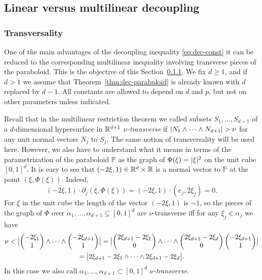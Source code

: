 \subsection{Linear versus multilinear decoupling}
\subsubsection{Transversality}\label{sec:gen:transverse}
One of the main advantages of the decoupling inequality \eqref{eq:dec-const} it can be reduced to the corresponding multilinear inequality involving transverse pieces of the paraboloid.
This is the objective of this Section~\ref{sec:gen:transverse}.
We fix $d\geq 1$, and if $d>1$ we assume that Theorem~\ref{thm:dec-paraboloid} is already known with $d$ replaced by $d-1$.
All constants are allowed to depend on $d$ and $p$, but not on other parameters unless indicated.

Recall that in the multilinear restriction theorem we called subsets $S_{1},\dotsc,S_{d+1}$ of a $d$-dimensional hypersurface in $\R^{d+1}$ \emph{$\nu$-transverse} if $\abs{N_{1} \wedge \dotsb \wedge N_{d+1}} > \nu$ for any unit normal vectors $N_{j}$ to $S_{j}$.
The same notion of transversality will be used here.
However, we also have to understand what it means in terms of the parametrization of the paraboloid $\mathbb{P}$ as the graph of $\Phi(\xi) = \abs{\xi}^{2}$ on the unit cube $[0,1]^{d}$.
It is easy to see that $(-2\xi,1) \in \R^{d}\times\R$ is a normal vector to $\mathbb{P}$ at the point $(\xi,\Phi(\xi))$.
Indeed,
\[
(-2\xi,1) \cdot \partial_{j} (\xi,\Phi(\xi))
=
(-2\xi,1) \cdot (e_{j}, 2\xi_{j})
=
0.
\]
For $\xi$ in the unit cube the length of the vector $(-2\xi,1)$ is $\sim 1$, so the pieces of the graph of $\Phi$ over $\alpha_{1},\dotsc,\alpha_{d+1} \subseteq [0,1]^{d}$ are $\nu$-transverse iff for any $\xi_{j}\in\alpha_{j}$ we have
\begin{multline*}
\nu < \abs[\big]{
\begin{pmatrix} -2\xi_{1} \\ 1 \end{pmatrix}  \wedge\dotsb\wedge \begin{pmatrix} -2\xi_{d+1} \\ 1 \end{pmatrix}
}
=
\abs[\big]{
\begin{pmatrix} 2\xi_{d+1}-2\xi_{1} \\ 0 \end{pmatrix}  \wedge\dotsb\wedge \begin{pmatrix} 2\xi_{d+1}-2\xi_{d} \\ 0 \end{pmatrix} \begin{pmatrix} -2\xi_{d+1} \\ 1 \end{pmatrix}
}\\
=
\abs[\big]{
2\xi_{d+1}-2\xi_{1} \wedge\dotsb\wedge 2\xi_{d+1}-2\xi_{d}
}.
\end{multline*}
In this case we also call $\alpha_{1},\dots,\alpha_{d+1}\subset [0,1]^{d}$ \emph{$\nu$-transverse}.

